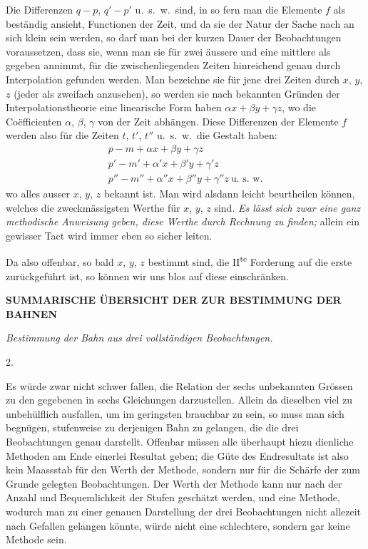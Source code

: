 Die Differenzen $q-p$, $q'-p'$ u.\ s.\ w.\ sind, in so fern man die Elemente $f$ als beständig ansieht, Functionen der Zeit, und da sie der Natur der Sache nach an sich klein sein werden, so darf man bei der kurzen Dauer der Beobachtungen voraussetzen, dass sie, wenn man sie für zwei äussere und eine mittlere als gegeben annimmt, für die zwischenliegenden Zeiten hinreichend genau durch Interpolation gefunden werden. Man bezeichne sie für jene drei Zeiten durch $x$, $y$, $z$ (jeder als zweifach anzusehen), so werden sie nach bekannten Gründen der Interpolationstheorie eine linearische Form haben $\alpha x+\beta y+\gamma z$, wo die Coëfficienten $\alpha$, $\beta$, $\gamma$ von der Zeit abhängen. Diese Differenzen der Elemente $f$ werden also für die Zeiten $t$, $t'$, $t''$ u.\ s.\ w.\ die Gestalt haben:
\[
\begin{gathered}
p-m+\alpha x+\beta y+\gamma z\\
p'-m'+\alpha'x+\beta'y+\gamma'z\\
p''-m''+\alpha''x+\beta''y+\gamma''z\ \text{u.\ s.\ w.}
\end{gathered}
\]
wo alles ausser $x$, $y$, $z$ bekannt ist. Man wird alsdann leicht beurtheilen können, welches die zweckmässigsten Werthe für $x$, $y$, $z$ sind. \emph{Es lässt sich zwar eine ganz methodische Anweisung geben, diese Werthe durch Rechnung zu finden;} allein ein gewisser Tact wird immer eben so sicher leiten.

Da also offenbar, so bald $x$, $y$, $z$ bestimmt sind, die II\textsuperscript{te} Forderung auf die erste zurückgeführt ist, so können wir uns blos auf diese einschränken.

\clearpage
\thispagestyle{empty}
\noindent{}%
%
\parbox[t]{\dimexpr\linewidth-24mm\relax}{\centering\fontsize{7.4}{9.2}\selectfont\bfseries SUMMARISCHE ÜBERSICHT DER ZUR BESTIMMUNG DER BAHNEN\par}%
\makebox[12mm][r]{}\par\nobreak\smallskip
\begin{center}
\emph{Bestimmung der Bahn aus drei vollständigen Beobachtungen.}\par
2.
\end{center}
\par\indent Es würde zwar nicht schwer fallen, die Relation der sechs unbekannten Grössen zu den gegebenen in sechs Gleichungen darzustellen. Allein da dieselben viel zu unbehülflich ausfallen, um im geringsten brauchbar zu sein, so muss man sich begnügen, stufenweise zu derjenigen Bahn zu gelangen, die die drei Beobachtungen genau darstellt. Offenbar müssen alle überhaupt hiezu dienliche Methoden am Ende einerlei Resultat geben; die Güte des Endresultats ist also kein Maassstab für den Werth der Methode, sondern nur für die Schärfe der zum Grunde gelegten Beobachtungen. Der Werth der Methode kann nur nach der Anzahl und Bequemlichkeit der Stufen geschätzt werden, und eine Methode, wodurch man zu einer genauen Darstellung der drei Beobachtungen nicht allezeit nach Gefallen gelangen könnte, würde nicht eine schlechtere, sondern gar keine Methode sein.

